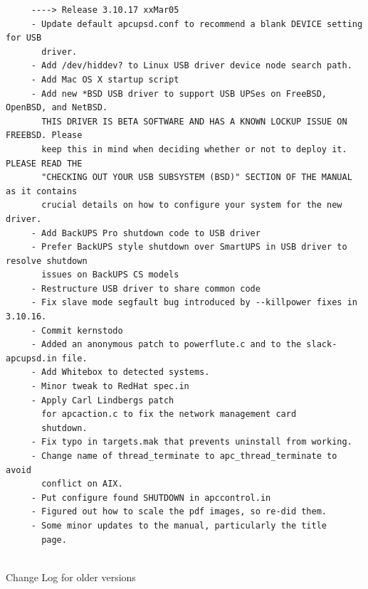 \footnotesize
\begin{verbatim}
     ----> Release 3.10.17 xxMar05
     - Update default apcupsd.conf to recommend a blank DEVICE setting for USB
       driver.
     - Add /dev/hiddev? to Linux USB driver device node search path.
     - Add Mac OS X startup script
     - Add new *BSD USB driver to support USB UPSes on FreeBSD, OpenBSD, and NetBSD.
       THIS DRIVER IS BETA SOFTWARE AND HAS A KNOWN LOCKUP ISSUE ON FREEBSD. Please
       keep this in mind when deciding whether or not to deploy it. PLEASE READ THE
       "CHECKING OUT YOUR USB SUBSYSTEM (BSD)" SECTION OF THE MANUAL as it contains
       crucial details on how to configure your system for the new driver.
     - Add BackUPS Pro shutdown code to USB driver
     - Prefer BackUPS style shutdown over SmartUPS in USB driver to resolve shutdown
       issues on BackUPS CS models
     - Restructure USB driver to share common code
     - Fix slave mode segfault bug introduced by --killpower fixes in 3.10.16.
     - Commit kernstodo
     - Added an anonymous patch to powerflute.c and to the slack-apcupsd.in file.
     - Add Whitebox to detected systems.
     - Minor tweak to RedHat spec.in
     - Apply Carl Lindbergs patch
       for apcaction.c to fix the network management card
       shutdown.
     - Fix typo in targets.mak that prevents uninstall from working.
     - Change name of thread_terminate to apc_thread_terminate to avoid
       conflict on AIX.
     - Put configure found SHUTDOWN in apccontrol.in
     - Figured out how to scale the pdf images, so re-did them.
     - Some minor updates to the manual, particularly the title
       page.
     
\end{verbatim}
\normalsize

Change Log for older versions 

